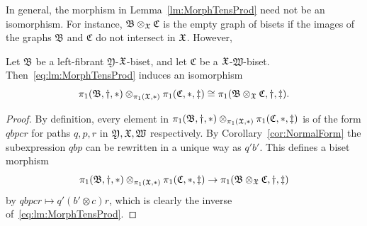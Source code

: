 \documentclass{amsart}
\begin{document}
In general, the morphism in Lemma~\ref{lm:MorphTensProd} need not be
an isomorphism. For instance, $\mathfrak B\otimes_{\mathfrak X}\mathfrak C$ is
the empty graph of bisets if the images of the graphs $\mathfrak B$
and $\mathfrak C$ do not intersect in ${\mathfrak X}$. However,
\begin{lem}\label{lem:tensor commutes with pi1}
  Let $\mathfrak B$ be a left-fibrant $\mathfrak Y$-${\mathfrak X}$-biset, and let
  $\mathfrak C$ be a ${\mathfrak X}$-$\mathfrak
  W$-biset. Then~\eqref{eq:lm:MorphTensProd} induces an isomorphism
  \[\pi_1(\mathfrak B,\dagger,*)\otimes_{\pi_1({\mathfrak X},*)}
  \pi_1(\mathfrak C,*,\ddagger)\cong\pi_1(\mathfrak
  B\otimes_{\mathfrak X}\mathfrak C,\dagger,\ddagger).\]
\end{lem}
\begin{proof}
  By definition, every element in $\pi_1(\mathfrak
  B,\dagger,*)\otimes_{\pi_1({\mathfrak X},*)}\pi_1(\mathfrak C,*,\ddagger)$ is of
  the form $q b p c r$ for paths $q,p,r$ in $\mathfrak Y,{\mathfrak X},\mathfrak W$
  respectively. By Corollary~\ref{cor:NormalForm} the subexpression $q b p$
  can be rewritten in a unique way as $q' b'$. This defines a biset morphism
  \[\pi_1(\mathfrak B,\dagger,*)\otimes_{\pi_1(\mathfrak X,*)}\pi_1(\mathfrak C,*,\ddagger)\to\pi_1(\mathfrak B\otimes_{\mathfrak X}\mathfrak C,\dagger,\ddagger)
  \]
  by $q b p c r\mapsto q'(b'\otimes c)r$, which is clearly the inverse
  of~\eqref{eq:lm:MorphTensProd}.
\end{proof}
\end{document}

